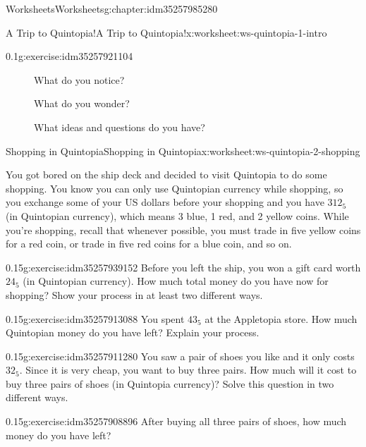 \documentclass[twoside,11pt,]{book}
\begin{document}
\begin{chapterptx}{Worksheets}{}{Worksheets}{}{}{g:chapter:idm35257985280}
\begin{worksheet-section-numberless}{A Trip to Quintopia!}{}{A Trip to Quintopia!}{}{}{x:worksheet:ws-quintopia-1-intro}
\begin{divisionexercise}{2}{}{0.1}{g:exercise:idm35257921104}
\begin{description}
\item[{}]What do you notice?\item[{}]What do you wonder?\item[{}]What ideas and questions do you have?\end{description}
\end{divisionexercise}%
\end{worksheet-section-numberless}
\restoregeometry
%
%
\typeout{************************************************}
\typeout{************************************************}
%
\begin{worksheet-section-numberless}{Shopping in Quintopia}{}{Shopping in Quintopia}{}{}{x:worksheet:ws-quintopia-2-shopping}
\begin{introduction}{}%
You got bored on the ship deck and decided to visit Quintopia to do some shopping. You know you can only use Quintopian currency while shopping, so you exchange some of your US dollars before your shopping and you have \(312_{5}\) (in Quintopian currency), which means 3 blue, 1 red, and 2 yellow coins. While you’re shopping, recall that whenever possible, you must trade in five yellow coins for a red coin, or trade in five red coins for a blue coin, and so on.%
\end{introduction}%
\begin{divisionexercise}{1}{}{0.15}{g:exercise:idm35257939152}%
Before you left the ship, you won a gift card worth \(24_{5}\) (in Quintopian currency). How much total money do you have now for shopping? Show your process in at least two different ways.%
\end{divisionexercise}%
\begin{divisionexercise}{2}{}{0.15}{g:exercise:idm35257913088}%
You spent \(43_{5}\) at the Appletopia store. How much Quintopian money do you have left?  Explain your process.%
\end{divisionexercise}%
\begin{divisionexercise}{3}{}{0.15}{g:exercise:idm35257911280}%
You saw a pair of shoes you like and it only costs \(32_{5}\). Since it is very cheap, you want to buy three pairs. How much will it cost to buy three pairs of shoes (in Quintopia currency)? Solve this question in two different ways.%
\end{divisionexercise}%
\clearpage
\begin{divisionexercise}{4}{}{0.15}{g:exercise:idm35257908896}%
After buying all three pairs of shoes, how much money do you have left?%

\end{divisionexercise}
\end{worksheet-section-numberless}
\end{chapterptx}
\end{document}
